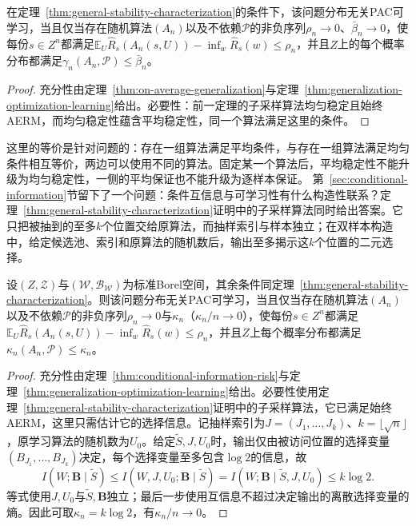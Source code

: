 \begin{theorem}[一般学习基本定理的平均稳定性形式]
\label{thm:average-stability-characterization}
在定理~\ref{thm:general-stability-characterization}的条件下，该问题分布无关PAC可学习，当且仅当存在随机算法$(A_n)$以及不依赖$\mathcal P$的非负序列$\rho_n\to0$、$\bar\beta_n\to0$，使每份$s\in Z^n$都满足$\mathbb E_U\hat R_s(A_n(s,U))-\inf_w\hat R_s(w)\leq\rho_n$，并且$Z$上的每个概率分布都满足$\gamma_n(A_n,\mathcal P)\leq\bar\beta_n$。
\end{theorem}
\begin{proof}
充分性由定理~\ref{thm:on-average-generalization}与定理~\ref{thm:generalization-optimization-learning}给出。必要性：前一定理的子采样算法均匀稳定且始终AERM，而均匀稳定性蕴含平均稳定性，同一个算法满足这里的条件。
\end{proof}

这里的等价是针对问题的：存在一组算法满足平均条件，与存在一组算法满足均匀条件相互等价，两边可以使用不同的算法。固定某一个算法后，平均稳定性不能升级为均匀稳定性，一侧的平均保证也不能升级为逐样本保证。
第~\ref{sec:conditional-information}节留下了一个问题：条件互信息与可学习性有什么构造性联系？定理~\ref{thm:general-stability-characterization}证明中的子采样算法同时给出答案。它只把被抽到的至多$k$个位置交给原算法，而抽样索引与样本独立；在双样本构造中，给定候选池、索引和原算法的随机数后，输出至多揭示这$k$个位置的二元选择。
\begin{theorem}[条件互信息稳定性与可学习性]
\label{thm:conditional-information-learning}
设$(Z,\mathcal Z)$与$(\mathcal W,\mathcal B_{\mathcal W})$为标准Borel空间，其余条件同定理~\ref{thm:general-stability-characterization}。则该问题分布无关PAC可学习，当且仅当存在随机算法$(A_n)$以及不依赖$\mathcal P$的非负序列$\rho_n\to0$与$\kappa_n$（$\kappa_n/n\to0$），使每份$s\in Z^n$都满足$\mathbb E_U\hat R_s(A_n(s,U))-\inf_w\hat R_s(w)\leq\rho_n$，并且$Z$上每个概率分布都满足$\kappa_n(A_n,\mathcal P)\leq\kappa_n$。
\end{theorem}
\begin{proof}
充分性由定理~\ref{thm:conditional-information-risk}与定理~\ref{thm:generalization-optimization-learning}给出。必要性使用定理~\ref{thm:general-stability-characterization}证明中的子采样算法，它已满足始终AERM，这里只需估计它的选择信息。记抽样索引为$J=(J_1,\ldots,J_k)$、$k=\lfloor\sqrt n\rfloor$，原学习算法的随机数为$U_0$。给定$\tilde S,J,U_0$时，输出仅由被访问位置的选择变量$(B_{J_1},\ldots,B_{J_k})$决定，每个选择变量至多包含$\log2$的信息，故
\[
 I(W;\bm B\mid\tilde S)\leq I(W,J,U_0;\bm B\mid\tilde S)=I(W;\bm B\mid\tilde S,J,U_0)\leq k\log2.
\]
等式使用$J,U_0$与$\tilde S,\bm B$独立；最后一步使用互信息不超过决定输出的离散选择变量的熵。因此可取$\kappa_n=k\log2$，有$\kappa_n/n\to0$。
\end{proof}


